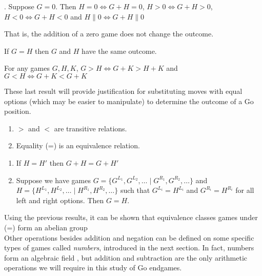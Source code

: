 \documentclass[../math194_paper.tex]{subfiles}
\begin{document}
\begin{theorem}. Suppose $G = 0$. Then
    $H = 0 \iff G + H = 0$, $H > 0 \iff G + H > 0$, $H < 0 \iff G+H < 0$ and 
    $H \parallel 0 \iff G + H \parallel 0$ 
\end{theorem}
That is, the addition of a zero game does not change the outcome.
\begin{corollary}
    If $G = H$ then $G$ and $H$ have the same outcome.
\end{corollary}

\begin{corollary}
    For any games $G, H, K$, $G > H \iff G + K > H + K$ and $G < H \iff G + K < G + K$
\end{corollary}

These last result will provide justification for substituting moves with equal options (which may be easier to manipulate) to determine the outcome of a Go position.

\begin{theorem} \:
\label{equivalence}
\begin{enumerate} 
    \item $>$ and $<$ are transitive relations.
    \item Equality (=) is an equivalence relation.
\end{enumerate}
\end{theorem}

\begin{theorem} \:
\begin{enumerate}
    \item If $H = H'$ then $G + H = G + H'$
    \item Suppose we have games  $G = \{G^{L_1}, G^{L_2}, \ldots  \mid G^{R_1}, G^{R_2}, \ldots\}$ and 
    $H = \{H^{L_1}, H^{L_2}, \ldots  \mid H^{R_1}, H^{R_2}, \ldots\}$ such that $G^{L_i} = H^{L_i}$ 
    and $G^{R_i} = H^{R_i}$ for all left and right options. Then $G = H$. 
\end{enumerate}
\end{theorem}

Using the previous results, it can be shown that equivalence classes games under (=) form 
an abelian group \cite[\S 2]{schleicher2006introduction} \\
Other operations besides addition and negation can be defined on some 
specific types of games called \textit{numbers}, introduced in the next section.
In fact, numbers form an algebraic field \cite[\S 3]{schleicher2006introduction}, 
but addition and subtraction are the only arithmetic operations we will require in this 
study of Go endgames. 
\end{document}
